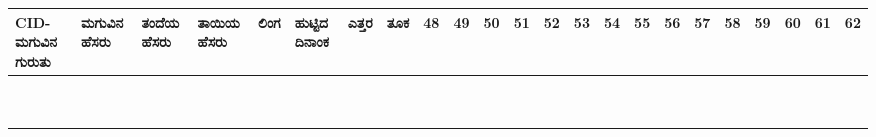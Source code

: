 ﻿\documentclass[12pt]{article}
\newcommand{\kn}[1]{%
{\fontspec[Script=Kannada]{Kedage}%
#1
}}
\begin{document}
\begin{tabular}{|p{2cm}|p{3cm}|p{2.6cm}|p{2.6cm}|p{0.7cm}|p{1cm}|l|l|l|l|l|l|l|l|l|l|l|l|l|l|l|l|l|}
CID-\kn{ಮಗುವಿನ ಗುರುತು} & \kn{ಮಗುವಿನ ಹೆಸರು} & \kn{ತಂದೆಯ ಹೆಸರು} & \kn{ತಾಯಿಯ ಹೆಸರು} & \kn{ಲಿಂಗ} & \kn{ಹುಟ್ಟಿದ ದಿನಾಂಕ} & \kn{ಎತ್ತರ} & \kn{ತೂಕ} & 48 & 49 & 50 & 51 & 52 & 53 & 54 & 55 & 56 & 57 & 58 & 59 & 60 & 61 & 62 \\ \hline
& & & & & & & &  & & & & & & & & & & & & & & \\ \hline
& & & & & & & &  & & & & & & & & & & & & & & \\ \hline
& & & & & & & &  & & & & & & & & & & & & & & \\ \hline
& & & & & & & &  & & & & & & & & & & & & & & \\ \hline
& & & & & & & &  & & & & & & & & & & & & & & \\ \hline
& & & & & & & &  & & & & & & & & & & & & & & \\ \hline
& & & & & & & &  & & & & & & & & & & & & & & \\ \hline
& & & & & & & &  & & & & & & & & & & & & & & \\ \hline
& & & & & & & &  & & & & & & & & & & & & & & \\ \hline
& & & & & & & &  & & & & & & & & & & & & & & \\ \hline

\end{tabular}
\end{document}

